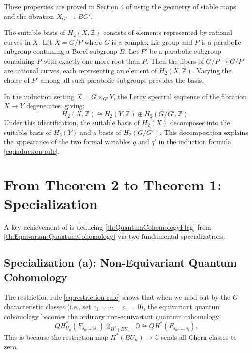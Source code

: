 These properties are proved in Section 4 of \cite{Kim1996} using the geometry of stable maps and the fibration $X_{G'} \to BG'$.

\begin{Remark}
The suitable basis of $H_2(X, \mathbb{Z})$ consists of elements represented by rational curves in $X$. Let $X = G/P$ where $G$ is a complex Lie group and $P$ is a parabolic subgroup containing a Borel subgroup $B$. Let $P'$ be a parabolic subgroup containing $P$ with exactly one more root than $P$. Then the fibers of $G/P \to G/P'$ are rational curves, each representing an element of $H_2(X, \mathbb{Z})$. Varying the choice of $P'$ among all such parabolic subgroups provides the basis.
\end{Remark}

\begin{Remark}
In the induction setting $X = G \times_{G'} Y$, the Leray spectral sequence of the fibration $X \to Y$ degenerates, giving:
\[
H_2(X, \mathbb{Z}) \cong H_2(Y, \mathbb{Z}) \oplus H_2(G/G', \mathbb{Z}).
\]
Under this identification, the suitable basis of $H_2(X)$ decomposes into the suitable basis of $H_2(Y)$ and a basis of $H_2(G/G')$. This decomposition explains the appearance of the two formal variables $q$ and $q'$ in the induction formula \cref{eq:induction-rule}.
\end{Remark}

\section{From Theorem 2 to Theorem 1: Specialization}

A key achievement of \cite{Kim1996} is deducing \cref{th:QuantumCohomologyFlag} from \cref{th:EquivariantQuantumCohomology} via two fundamental specializations:

\subsection{Specialization (a): Non-Equivariant Quantum Cohomology}
The restriction rule \cref{eq:restriction-rule} shows that when we mod out by the $G$-characteristic classes (i.e., set $c_1 = \cdots = c_n = 0$), the equivariant quantum cohomology becomes the ordinary non-equivariant quantum cohomology:
\[
QH_{U_n}^*(F_{s_0,\ldots,s_l}) \otimes_{H^*(BU_n)} \mathbb{Q} \cong QH^*(F_{s_0,\ldots,s_l}).
\]
This is because the restriction map $H^*(BU_n) \to \mathbb{Q}$ sends all Chern classes to zero.

